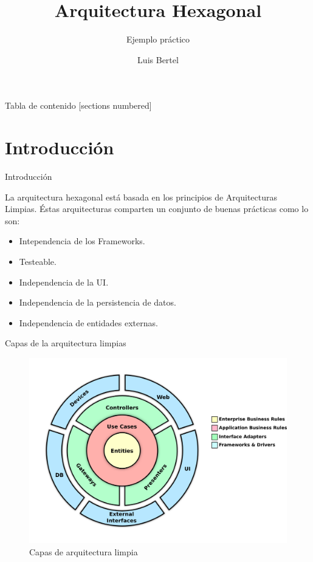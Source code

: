 \documentclass[10pt]{beamer}
\title{Arquitectura Hexagonal}
\subtitle{Ejemplo práctico}
\date{}
\author{Luis Bertel}
\institute{}
\begin{document}
\maketitle

\begin{frame}{Tabla de contenido}
  [sections numbered]
  \tableofcontents%
\end{frame}

\section[Introducción]{Introducción}

\begin{frame}[fragile]{Introducción}
	
	La arquitectura hexagonal está basada en los principios de  \alert{Arquitecturas Limpias}. Éstas arquitecturas comparten un conjunto de buenas prácticas como lo son:
	
	\begin{itemize}
		\item Intependencia de los Frameworks.
		\item Testeable.		
		\item Independencia de la UI.
		\item Independencia de la persistencia de datos.
		\item Independencia de entidades externas.
	\end{itemize}

 
\end{frame}


\begin{frame}[fragile]{Capas de la arquitectura limpias}

\begin{figure}
	\centering
	\includegraphics[width=0.8\linewidth]{img/JD606Sqx6RYZLKdu}
	\caption[clean]{Capas de arquitectura limpia}
	\label{fig:jd606sqx6ryzlkdu}
\end{figure}

\end{frame}
\end{document}

